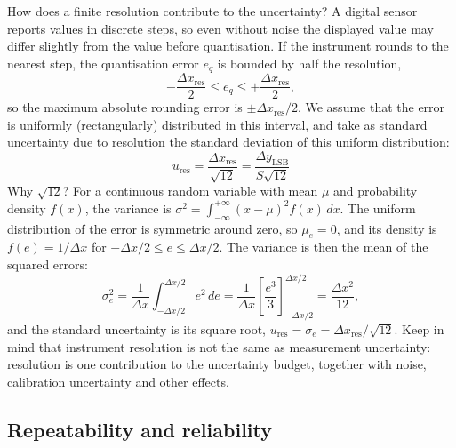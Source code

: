 \documentclass[letterpaper,11pt,leqno]{book}
\begin{document}
How does a finite resolution contribute to the uncertainty? A digital sensor reports values in discrete steps, so even without noise the displayed value may differ slightly from the value before quantisation. If the instrument rounds to the nearest step, the quantisation error $e_q$ is bounded by half the resolution,
\begin{equation}
-\frac{\Delta x_{\text{res}}}{2} \le e_q \le +\frac{\Delta x_{\text{res}}}{2},
\label{eq:quantization_bounds}
\end{equation}
so the maximum absolute rounding error is $\pm\Delta x_{\text{res}}/2$. We assume that the error is uniformly (rectangularly) distributed in this interval, and take as standard uncertainty due to resolution the standard deviation of this uniform distribution:
\begin{equation}
\boxed{u_{\text{res}} = \frac{\Delta x_{\text{res}}}{\sqrt{12}} = \frac{\Delta y_{\text{LSB}}}{S\sqrt{12}}}
\label{eq:standard_uncertainty_resolution_sqrt12}
\end{equation}
Why $\sqrt{12}$? For a continuous random variable with mean $\mu$ and probability density $f(x)$, the variance is $\sigma^2 = \int_{-\infty}^{+\infty}(x - \mu)^2f(x)\,dx$. The uniform distribution of the error is symmetric around zero, so $\mu_e = 0$, and its density is $f(e) = 1/\Delta x$ for $-\Delta x/2 \le e \le \Delta x/2$. The variance is then the mean of the squared errors:
\begin{equation}
\sigma_e^2 = \frac{1}{\Delta x}\int_{-\Delta x/2}^{\Delta x/2}e^2\,de = \frac{1}{\Delta x}\left[\frac{e^3}{3}\right]_{-\Delta x/2}^{\Delta x/2} = \frac{\Delta x^2}{12},
\label{eq:variance_uniform_proof}
\end{equation}
and the standard uncertainty is its square root, $u_{\text{res}} = \sigma_e = \Delta x_{\text{res}}/\sqrt{12}$. Keep in mind that instrument resolution is not the same as measurement uncertainty: resolution is one contribution to the uncertainty budget, together with noise, calibration uncertainty and other effects.

\subsection{Repeatability and reliability}
\end{document}
